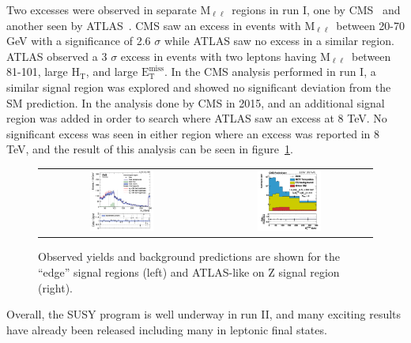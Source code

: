 \documentclass{article}
\newcommand{\MET}{${\mathrm{E_{T}^{miss}}}$}
\newcommand{\HT}{$\mathrm{H_T}$}
\newcommand{\mll}{$\mathrm{M_{\ell\ell}}$}
\begin{document}
Two excesses were observed in separate \mll\ regions in run I, one by CMS~\cite{CMSedge} and another seen by ATLAS~\cite{ATLASZPAPER}.
CMS saw an excess in events with \mll\ between 20-70 GeV with a significance of 2.6 $\sigma$ while ATLAS saw no excess in a similar region.
ATLAS observed a 3 $\sigma$ excess in events with two leptons having \mll\ between 81-101, large \HT, and large \MET.
In the CMS analysis performed in run I, a similar signal region was explored and showed no significant deviation from the SM prediction.
In the analysis done by CMS in 2015, and an additional signal region was added in order to search where ATLAS saw an excess at 8 TeV.
No significant excess was seen in either region where an excess was reported in 8 TeV, and the result of this analysis can be seen in figure~\ref{fig:2leposresults}.

\begin{figure}[!htb]
\begin{center}
\begin{tabular}{cc}
\includegraphics[width=0.4\textwidth]{edge_mll.pdf} &
\includegraphics[width=0.4\textwidth]{MET_ATLAS_SR.pdf}
\end{tabular}
\caption{
\label{fig:2leposresults}
Observed yields and background predictions are shown for the ``edge'' signal regions (left) and ATLAS-like on Z signal region (right).
}
\end{center}
\end{figure}

Overall, the SUSY program is well underway in run II, and many exciting results have already been released including many in leptonic final states.
\end{document}
